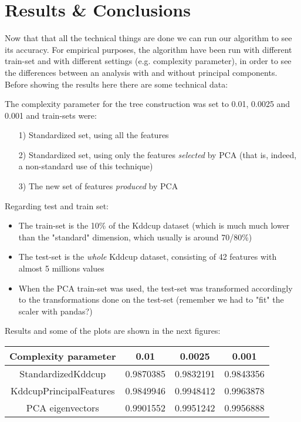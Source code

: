 \chapter{Results \& Conclusions}

Now that that all the technical things are done we can run our algorithm to see its accuracy.\newline\newline
For empirical purposes, the algorithm have been run with different train-set and with different settings (e.g. complexity parameter), in order to see the differences between an analysis with and without principal components.\newline
Before showing the results here there are some technical data:\newline

The complexity parameter for the tree construction was set to 0.01, 0.0025 and 0.001 and train-sets were:\newline

\begin{itemize}
	\item[1)] Standardized set, using all the features
	\item[2)] Standardized set, using only the features \emph{selected} by PCA (that is, indeed, a non-standard use of this technique)
	\item[3)] The new set of features \emph{produced} by PCA
\end{itemize}

Regarding test and train set:

\begin{itemize}
	\item The train-set is the 10\% of the Kddcup dataset (which is much much lower than the "standard" dimension, which usually is around 70/80\%)
	\item The test-set is the \emph{whole} Kddcup dataset, consisting of 42 features with almost 5 millions values
	\item When the PCA train-set was used, the test-set was transformed accordingly to the transformations done on the test-set (remember we had to "fit" the scaler with pandas?)
\end{itemize}

Results and some of the plots are shown in the next figures:


\begin{center}
	{\setlength{\extrarowheight}{20pt}
	\begin{tabular}{| c | c | c | c |}
	\hline
		Complexity parameter & 0.01 & 0.0025 & 0.001 \\ \hline
		StandardizedKddcup & 0.9870385 & 0.9832191 & 0.9843356 \\ \hline
		KddcupPrincipalFeatures & 0.9849946 & 0.9948412 & 0.9963878 \\ \hline
		PCA eigenvectors & 0.9901552 & 0.9951242 & 0.9956888 \\ 
		\hline
	\end{tabular}}
\end{center}


